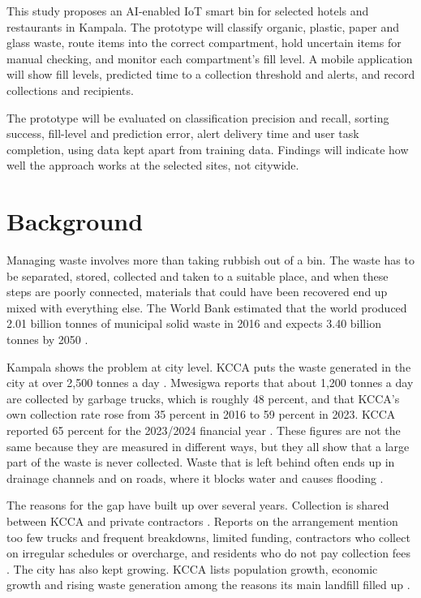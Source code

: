 \documentclass[12pt,a4paper]{report}
\begin{document}
This study proposes an AI-enabled IoT smart bin for selected hotels and restaurants in Kampala. The prototype will classify organic, plastic, paper and glass waste, route items into the correct compartment, hold uncertain items for manual checking, and monitor each compartment's fill level. A mobile application will show fill levels, predicted time to a collection threshold and alerts, and record collections and recipients.

The prototype will be evaluated on classification precision and recall, sorting success, fill-level and prediction error, alert delivery time and user task completion, using data kept apart from training data. Findings will indicate how well the approach works at the selected sites, not citywide.

\section{Background}

Managing waste involves more than taking rubbish out of a bin. The waste has to be separated, stored, collected and taken to a suitable place, and when these steps are poorly connected, materials that could have been recovered end up mixed with everything else. The World Bank estimated that the world produced 2.01 billion tonnes of municipal solid waste in 2016 and expects 3.40 billion tonnes by 2050 \cite{kaza}.

Kampala shows the problem at city level. KCCA puts the waste generated in the city at over 2,500 tonnes a day \cite{kcca2026}. Mwesigwa \cite{mwesigwa} reports that about 1,200 tonnes a day are collected by garbage trucks, which is roughly 48 percent, and that KCCA's own collection rate rose from 35 percent in 2016 to 59 percent in 2023. KCCA reported 65 percent for the 2023/2024 financial year \cite{kcca2024a}. These figures are not the same because they are measured in different ways, but they all show that a large part of the waste is never collected. Waste that is left behind often ends up in drainage channels and on roads, where it blocks water and causes flooding \cite{ngwomoya,mwesigwa}.

The reasons for the gap have built up over several years. Collection is shared between KCCA and private contractors \cite{kccand}. Reports on the arrangement mention too few trucks and frequent breakdowns, limited funding, contractors who collect on irregular schedules or overcharge, and residents who do not pay collection fees \cite{ngwomoya,mwesigwa}. The city has also kept growing. KCCA lists population growth, economic growth and rising waste generation among the reasons its main landfill filled up \cite{kcca2026}.
\end{document}
